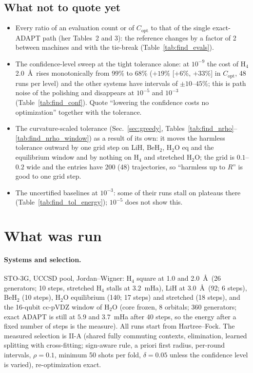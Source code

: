 \documentclass[11pt]{article}
\newcommand{\Copt}{C_{\mathrm{opt}}}
\begin{document}
\subsection{What not to quote yet}
\begin{itemize}
  \item Every ratio of an evaluation count or of $\Copt$ to that of the single exact-ADAPT path (her Tables~2 and 3): the reference changes by a factor of 2 between machines and with the tie-break (Table~\ref{tab:find_evals}).
  \item The confidence-level sweep at the tight tolerance alone: at $10^{-9}$ the cost of H$_4$ 2.0~\AA\ rises monotonically from 99\% to 68\% ($+19\%$ [$+6\%$, $+33\%$] in $\Copt$, 48 runs per level) and the other systems have intervals of $\pm10$--$45\%$; this is path noise of the polishing and disappears at $10^{-5}$ and $10^{-3}$ (Table~\ref{tab:find_conf}). Quote ``lowering the confidence costs no optimization'' together with the tolerance.
  \item The curvature-scaled tolerance (Sec.~\ref{sec:greedy}, Tables~\ref{tab:find_nrho}--\ref{tab:find_nrho_window}) as a result of its own: it moves the harmless tolerance outward by one grid step on LiH, BeH$_2$, H$_2$O eq and the equilibrium window and by nothing on H$_4$ and stretched H$_2$O; the grid is $0.1$--$0.2$ wide and the entries have 200 (48) trajectories, so ``harmless up to $R$'' is good to one grid step.
  \item The uncertified baselines at $10^{-3}$: some of their runs stall on plateaus there (Table~\ref{tab:find_tol_energy}); $10^{-5}$ does not show this.
\end{itemize}

\section{What was run}\label{sec:setup}

\paragraph{Systems and selection.} STO-3G, UCCSD pool, Jordan--Wigner: H$_4$ square at 1.0 and 2.0~\AA\ (26 generators; 10 steps, stretched H$_4$ stalls at $3.2$~mHa), LiH at 3.0~\AA\ (92; 6 steps), BeH$_2$ (10 steps), H$_2$O equilibrium (140; 17 steps)
and stretched (18 steps), and the 16-qubit cc-pVDZ window of H$_2$O (core frozen, 8 orbitals; 360 generators; exact ADAPT is still at $5.9$ and $3.7$~mHa after 40 steps, so the energy after a fixed number of steps is the measure). All runs start from Hartree--Fock.
The measured selection is II-A (shared fully commuting contexts, elimination, learned splitting with cross-fitting; sign-aware rule, a priori first radius, per-round intervals, $\rho=0.1$, minimum 50 shots per fold, $\delta=0.05$ unless the confidence level is varied), re-optimization exact.
\end{document}
